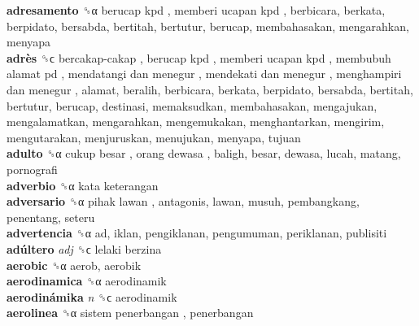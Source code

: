 \textbf{adresamento} ␝α   berucap kpd ,  memberi ucapan kpd , berbicara, berkata, berpidato, bersabda, bertitah, bertutur, berucap, membahasakan, mengarahkan, menyapa  \\
\textbf{adrès} ␝ϲ   bercakap-cakap ,  berucap kpd ,  memberi ucapan kpd ,  membubuh alamat pd ,  mendatangi dan menegur ,  mendekati dan menegur ,  menghampiri dan menegur , alamat, beralih, berbicara, berkata, berpidato, bersabda, bertitah, bertutur, berucap, destinasi, memaksudkan, membahasakan, mengajukan, mengalamatkan, mengarahkan, mengemukakan, menghantarkan, mengirim, mengutarakan, menjuruskan, menujukan, menyapa, tujuan  \\
\textbf{adulto} ␝α   cukup besar ,  orang dewasa , baligh, besar, dewasa, lucah, matang, pornografi  \\
\textbf{adverbio} ␝α   kata keterangan   \\
\textbf{adversario} ␝α   pihak lawan , antagonis, lawan, musuh, pembangkang, penentang, seteru  \\
\textbf{advertencia} ␝α  ad, iklan, pengiklanan, pengumuman, periklanan, publisiti  \\
\textbf{adúltero} \emph{adj}  ␝ϲ   lelaki berzina   \\
\textbf{aerobic} ␝α  aerob, aerobik  \\
\textbf{aerodinamica} ␝α  aerodinamik  \\
\textbf{aerodinámika} \emph{n}  ␝ϲ  aerodinamik  \\
\textbf{aerolinea} ␝α   sistem penerbangan , penerbangan  \\
